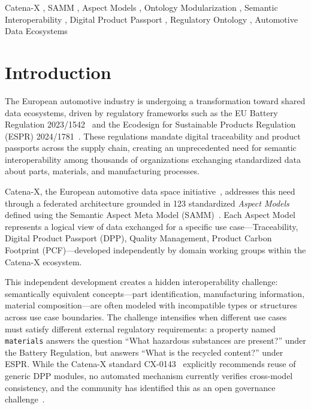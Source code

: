 \documentclass[]{ceurart}
\begin{document}
\begin{keywords}
  Catena-X \sep
  SAMM \sep
  Aspect Models \sep
  Ontology Modularization \sep
  Semantic Interoperability \sep
  Digital Product Passport \sep
  Regulatory Ontology \sep
  Automotive Data Ecosystems
\end{keywords}

\maketitle

\section{Introduction}\label{sec:introduction}

The European automotive industry is undergoing a transformation toward
shared data ecosystems, driven by regulatory frameworks such as the EU
Battery Regulation 2023/1542~\cite{eu2023battery} and the Ecodesign for
Sustainable Products Regulation (ESPR) 2024/1781~\cite{eu2024espr}.
These regulations mandate digital traceability and product passports
across the supply chain, creating an unprecedented need for semantic
interoperability among thousands of organizations exchanging
standardized data about parts, materials, and manufacturing processes.

Catena-X, the European automotive data space
initiative~\cite{catenax2024models}, addresses this need through a
federated architecture grounded in 123 standardized \emph{Aspect Models}
defined using the Semantic Aspect Meta Model
(SAMM)~\cite{samm2024, cx0003samm}. Each Aspect Model represents a
logical view of data exchanged for a specific use
case---Traceability, Digital Product Passport (DPP), Quality Management,
Product Carbon Footprint (PCF)---developed independently by domain
working groups within the Catena-X ecosystem.

This independent development creates a hidden interoperability
challenge: semantically equivalent concepts---part identification,
manufacturing information, material composition---are often modeled
with incompatible types or structures across use case boundaries. The
challenge intensifies when different use cases must satisfy different
external regulatory requirements: a property named \texttt{materials}
answers the question ``What hazardous substances are present?'' under
the Battery Regulation, but answers ``What is the recycled content?''
under ESPR. While the Catena-X standard
CX-0143~\cite{cx0143dpp} explicitly recommends reuse of generic DPP
modules, no automated mechanism currently verifies cross-model
consistency, and the community has identified this as an open governance
challenge~\cite{catenax2024issue720}.
\end{document}
